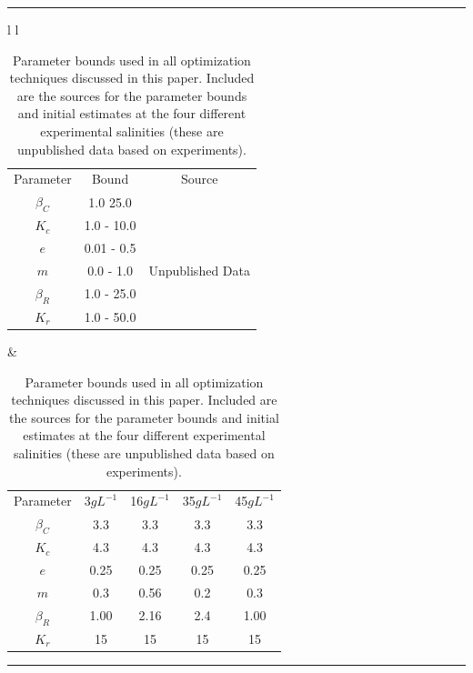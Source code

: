 \documentclass[twocolumn, 9pt]{article}
\begin{document}
{\footnotesize


}
\onecolumn
\begin{table}[ht]
	\caption{Parameter bounds used in all optimization techniques discussed in this paper. Included are the sources for the parameter bounds and initial estimates at the four different experimental salinities (these are unpublished data based on experiments).}
    \hrule
    \small
    \begin{tabular}{l l}
    	\label{table:Bounds} %
        	\begin{tabular}{c c c}
        	Parameter & Bound & Source \\
        	\cline{1-3}
        	$\beta_C$ & 1.0 25.0 & \cite{fussmann_crossing_2000, wen_biological_2005}  \\
            $K_c$ & 1.0 - 10.0 & \cite{laliberte_regulation_1989, ahmad_nitrogen_1984} \\
            $e$ & 0.01 - 0.5 & \cite{malekzadeh_viayeh_population_2010, snell_effect_1986}\\
            $m$ & 0.0 - 1.0 & Unpublished Data\\
            $\beta_R$ & 1.0 - 25.0 & \cite{doohan_energy_1973, peredo-alvarez_combined_nodate}\\
            $K_r$ & 1.0 - 50.0 & \cite{cheng_effects_2011, lowe_evidence_2005, yufera_factors_nodate}\\
        	\cline{1-3}
    	\end{tabular}
    	&
    	\label{table:Bounds} %
        	\begin{tabular}{c c c c c}
        	Parameter & 3$gL^{-1}$ & 16$gL^{-1}$ & 35$gL^{-1}$& 45$gL^{-1}$ \\
        	\cline{1-5}
        	$\beta_C$ & 3.3 & 3.3 & 3.3 & 3.3 \\
            $K_c$ & 4.3 & 4.3 & 4.3 & 4.3 \\
            $e$ & 0.25 & 0.25 & 0.25 & 0.25 \\
            $m$ & 0.3 & 0.56 & 0.2 & 0.3 \\
            $\beta_R$ & 1.00 & 2.16 & 2.4 & 1.00 \\
            $K_r$ & 15 & 15 & 15 & 15 \\
        	\cline{1-5}
    	\end{tabular}
    \end{tabular}
    \hrule
\end{table}
\end{document}
